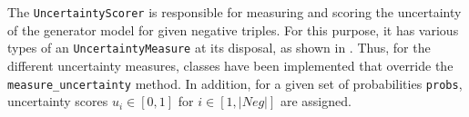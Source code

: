 The \texttt{UncertaintyScorer} is responsible for measuring and scoring the uncertainty of the generator model for given negative triples.
For this purpose, it has various types of an \texttt{UncertaintyMeasure} at its disposal, as shown in .
Thus, for the different uncertainty measures, classes have been implemented that override the \texttt{measure\_uncertainty} method.
In addition, for a given set of probabilities \texttt{probs}, uncertainty scores $u_i \in [0,1]$ for $i \in [1, |Neg|]$ are assigned.